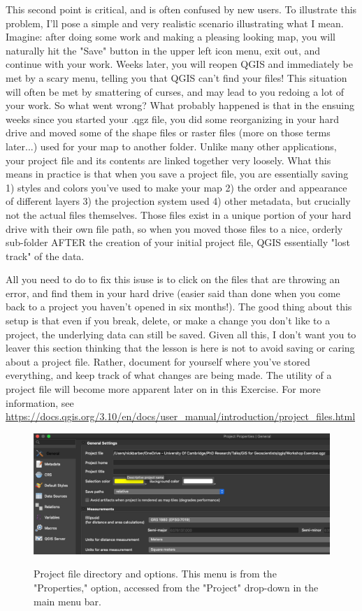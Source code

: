 \documentclass{article}
\begin{document}
This second point is critical, and is often confused by new users. To illustrate this problem, I'll pose a simple and very realistic scenario illustrating what I mean. Imagine: after doing some work and making a pleasing looking map, you will naturally hit the "Save" button in the upper left icon menu, exit out, and continue with your work. Weeks later, you will reopen QGIS and immediately be met by a scary menu, telling you that QGIS can't find your files! This situation will often be met by smattering of curses, and may lead to you redoing a lot of your work. So what went wrong? What probably happened is that in the ensuing weeks since you started your .qgz file, you did some reorganizing in your hard drive and moved some of the shape files or raster files (more on those terms later...) used for your map to another folder. Unlike many other applications, your project file and its contents are linked together very loosely. What this means in practice is that when you save a project file, you are essentially saving 1) styles and colors you've used to make your map 2) the order and appearance of different layers 3) the projection system used 4) other metadata, but crucially not the actual files themselves. Those files exist in a unique portion of your hard drive with their own file path, so when you moved those files to a nice, orderly sub-folder AFTER the creation of your initial project file, QGIS essentially "lost track" of the data. 

All you need to do to fix this isuse is to click on the files that are throwing an error, and find them in your hard drive (easier said than done when you come back to a project you haven't opened in six months!). The good thing about this setup is that even if you break, delete, or make a change you don't like to a project, the underlying data can still be saved. Given all this, I don't want you to leaver this section thinking that the lesson is here is not to avoid saving or caring about a project file. Rather, document for yourself where you've stored everything, and keep track of what changes are being made. The utility of a project file will become more apparent later on in this Exercise. For more information, see \url{https://docs.qgis.org/3.10/en/docs/user_manual/introduction/project_files.html}

\begin{figure}[htbp]
    \centering
    \includegraphics[width=\textwidth]{Figure 5.png}
    \label{fig5}
    \caption{Project file directory and options. This menu is from the "Properties," option, accessed from the "Project" drop-down in the main menu bar.}
\end{figure}
\end{document}
